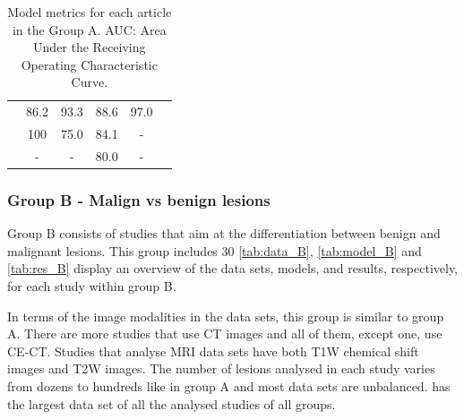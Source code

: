 \documentclass{article}
\begin{document}
\begin{table}[]
\begin{tabular}{cccccc}
        \cite{Schieda2017}                  & 86.2                                       & 93.3                                       & 88.6                                    & 97.0                               \\
        \cite{Tu2020}                       & 100                                        & 75.0                                       & 84.1                                    & -                                  \\
        \cite{Romeo2018}                    & -                                          & -                                          & 80.0                                    & -                                  \\
        \bottomrule
    \end{tabular}
    \caption{Model metrics for each article in the Group A. AUC: Area Under the Receiving Operating Characteristic Curve.}
    \label{tab:res_A}
\end{table}

\subsubsection{Group B - Malign vs benign lesions}

Group B consists of studies that aim at the differentiation between benign and
malignant lesions. This group includes 30%
\ref{tab:data_B}, \ref{tab:model_B} and \ref{tab:res_B} display an overview of
the data sets, models, and results, respectively, for each study within group B.

In terms of the image modalities in the data sets, this group is similar to
group A. There are more studies that use CT images and all of them, except one,
use CE-CT. Studies that analyse MRI data sets have both T1W chemical shift
images and T2W images. The number of lesions analysed in each study varies from
dozens to hundreds like in group A and most data sets are unbalanced.
\cite{Shoemaker2018} has the largest data set of all the analysed studies of all
groups.
\end{document}
